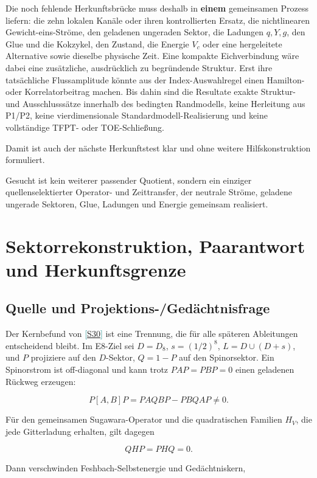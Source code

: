 \documentclass[11pt,a4paper,oneside,parskip=half,headings=normal,numbers=noenddot,bibliography=totoc]{scrreprt}
\newcommand{\src}[1]{\textcolor{teal}{\small[\hyperref[s:#1]{S#1}]}}
\newcommand{\finding}[2]{\begin{tcolorbox}[enhanced,breakable,colback=pale,colframe=teal,boxrule=0pt,borderline west={2pt}{0pt}{teal},arc=0mm,left=3mm,right=3mm,top=2mm,bottom=2mm,title={#1},coltitle=ink,colbacktitle=pale,fonttitle=\sffamily\bfseries]#2\end{tcolorbox}}
\begin{document}
Die noch fehlende Herkunftsbrücke muss deshalb in \textbf{einem} gemeinsamen Prozess liefern: die zehn lokalen Kanäle oder ihren kontrollierten Ersatz, die nichtlinearen Gewicht-eins-Ströme, den geladenen ungeraden Sektor, die Ladungen \(q,Y,g\), den Glue und die Kokzykel, den Zustand, die Energie \(V_c\) oder eine hergeleitete Alternative sowie dieselbe physische Zeit. Eine kompakte Eichverbindung wäre dabei eine zusätzliche, ausdrücklich zu begründende Struktur. Erst ihre tatsächliche Flussamplitude könnte aus der Index-Auswahlregel einen Hamilton- oder Korrelatorbeitrag machen. Bis dahin sind die Resultate exakte Struktur- und Ausschlusssätze innerhalb des bedingten Randmodells, keine Herleitung aus P1/P2, keine vierdimensionale Standardmodell-Realisierung und keine vollständige TFPT- oder TOE-Schließung.

Damit ist auch der nächste Herkunftstest klar und ohne weitere Hilfskonstruktion formuliert.

\finding{Entscheidende Herkunftslücke}{Gesucht ist kein weiterer passender Quotient, sondern ein einziger quellenselektierter Operator- und Zeittransfer, der neutrale Ströme, geladene ungerade Sektoren, Glue, Ladungen und Energie gemeinsam realisiert.}


\chapter{Sektorrekonstruktion, Paarantwort und Herkunftsgrenze}
\section{Quelle und Projektions-/Gedächtnisfrage}

Der Kernbefund von \src{30} ist eine Trennung, die für
alle späteren Ableitungen entscheidend bleibt. Im E8-Ziel sei
\(D=D_8\), \(s=(1/2)^8\), \(L=D\cup(D+s)\), und \(P\) projiziere auf den
\(D\)-Sektor, \(Q=1-P\) auf den Spinorsektor. Ein Spinorstrom ist
off-diagonal und kann trotz \(PAP=PBP=0\) einen geladenen Rückweg erzeugen:

\[
 P[A,B]P=PAQBP-PBQAP\ne0.
\]

Für den gemeinsamen Sugawara-Operator und die quadratischen Familien \(H_V\),
die jede Gitterladung erhalten, gilt dagegen

\[
 QHP=PHQ=0.
\]

Dann verschwinden Feshbach-Selbstenergie und Gedächtniskern,
\end{document}
